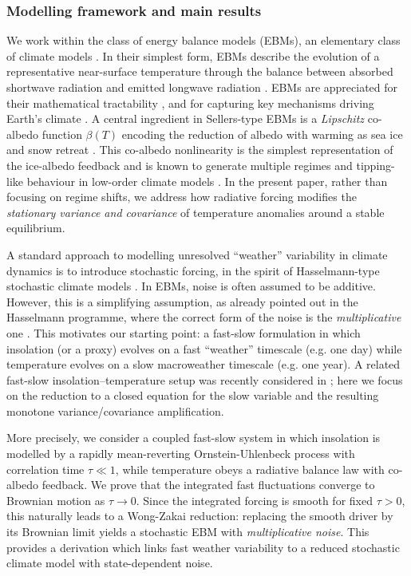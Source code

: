 \documentclass[10pt]{amsart}
\numberwithin{equation}{section}
\begin{document}
\subsubsection*{Modelling framework and main results}
We work within the class of energy balance models (EBMs), an elementary class of climate models \cite{North17}. In their simplest form, EBMs describe
the evolution of a representative near-surface temperature through the balance between absorbed shortwave
radiation and emitted longwave radiation \cite{Budyko1969,Sellers1969,Ghil1976}. EBMs are appreciated for their mathematical tractability \cite{Diaz97,Floridia2020,DelSarto26b, Fornasaro}, and for capturing key mechanisms driving Earth's climate \cite{Cannarsa2023,Bastiaansen2022, Goodwin, DelSarto26a}. A central ingredient in Sellers-type
EBMs is a \emph{Lipschitz} co-albedo function $\beta(T)$ encoding the reduction of albedo with warming as sea
ice and snow retreat \cite{North1981,RomboutsGhil2015, Lohmann}. This co-albedo nonlinearity is the simplest
representation of the ice-albedo feedback and is known to generate multiple regimes and tipping-like
behaviour in low-order climate models \cite{Ashwin2020,Ghil2020,lucarini2022}. In the present paper, rather than focusing on regime shifts, we
address how radiative forcing modifies the \emph{stationary variance and covariance} of temperature anomalies around a
stable equilibrium.

A standard approach to modelling unresolved ``weather'' variability in climate dynamics is to introduce
stochastic forcing, in the spirit of Hasselmann-type stochastic climate models \cite{Hasselmann1976,Arnold2001,Watkins}. In EBMs, noise is often
assumed to be additive. However, this is a simplifying assumption, as already pointed out in the Hasselmann programme, where the correct form of the noise is the \emph{multiplicative} one \cite{Hasselmann1976}. This motivates our starting point: a fast-slow formulation in which insolation (or a proxy) evolves
on a fast ``weather'' timescale (e.g. one day) while temperature evolves on a slow macroweather timescale (e.g. one year). A related fast-slow insolation–temperature setup was recently considered in \cite{Longo26}; here we focus on the reduction to a closed equation for the slow variable and the resulting monotone variance/covariance amplification.



More precisely, we consider a coupled fast-slow system in which insolation is modelled by a rapidly
mean-reverting Ornstein-Uhlenbeck process with correlation time $\tau\ll 1$, while temperature obeys a
radiative balance law with co-albedo feedback. We prove that the integrated
fast fluctuations converge to Brownian motion as $\tau\to 0$. Since the integrated forcing is smooth for
fixed $\tau>0$, this naturally leads to a Wong-Zakai reduction: replacing the smooth driver by its Brownian
limit yields a stochastic EBM with \emph{multiplicative noise}. This provides a derivation which links fast weather variability to a reduced stochastic climate model with state-dependent noise.
\end{document}
